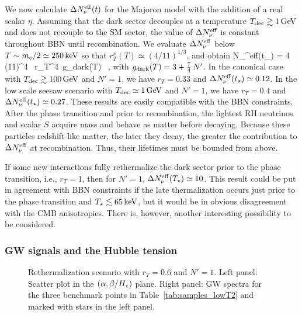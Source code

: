 \documentclass[a4paper,11pt]{article}
\begin{document}
We now calculate $\Delta N_\nu^{\rm eff}(t)$ for the Majoron model with the addition of a real scalar $\eta$.
Assuming that the dark sector decouples at a temperature $T _{\rm dec} \gtrsim 1\,{\rm GeV}$ and does not
recouple to the SM sector, the value of  $\Delta N_{\nu}^{\rm eff}$ is constant throughout BBN until recombination.
We evaluate  $\Delta N_{\nu}^{\rm eff}$ below $T \sim m_e/2 \simeq 250 \, {\rm keV}$
so that $r_{T}^{\nu}(T) \simeq (4/11)^{1/3}$, and obtain
\be\label{DNeff}
\D N_\nu^{\rm eff}(t_\star) = {4 }\,\left({11}\right)^{4}  \, r_T^4 \,g_{\rm dark}(T) \,  ,
\ee
with $g_{\rm dark}(T) =  3 + {7\over 4}\, N'$.
In the canonical case with $T_{\rm dec} \gtrsim 100\,{\rm GeV}$ and $N'=1$, we have $r_T =0.33$ and 
$\Delta N_\nu^{\rm eff}(t_\star) \simeq 0.12$. 
In the low scale seesaw scenario with $T_{\rm dec} \simeq 1\,{\rm GeV}$ and $N'=1$, we have $r_T = 0. 4$ and
$\Delta N_\nu^{\rm eff}(t_\star) \simeq 0.27$.  These results are easily compatible with the BBN constraints.
After the phase transition and prior to recombination, the lightest RH neutrinos and scalar $S$ acquire mass and behave as matter before decaying. Because these particles redshift like matter, the later they decay, the greater the contribution to $\Delta N_\nu^{\rm eff}$ at recombination. Thus, their lifetimes must be bounded from above.  

 If some new interactions fully rethermalize the dark
sector prior to the phase transition, i.e., $r_T =1$, then for $N' = 1$,
$\Delta N_\nu^{\rm eff}(T_\star) \simeq 10$. This result could be put in agreement with BBN constraints
if the late thermalization occurs just prior to the phase transition and 
$T_\star \lesssim 65 \, {\rm keV}$, but it would be in obvious disagreement 
with the CMB anisotropies. 
There is, however, another interesting possibility to be considered.

\subsubsection{GW signals and the Hubble tension}

\begin{figure}[t]
\begin{center}
\hspace{2mm}
\end{center}
\caption{Rethermalization scenario with $r_T = 0.6$ and $N' =1$. Left panel: Scatter plot in the $(\alpha, \beta/H_\star)$ plane. Right panel: GW spectra for the three benchmark points in Table~\ref{tab:samples_lowT2} and marked with stars in the left panel.}
\label{f5}
\end{figure}
\end{document}
